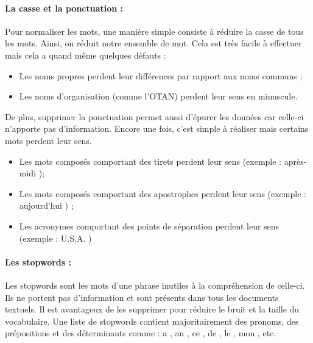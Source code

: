                 \paragraph{La casse et la ponctuation :}
                    Pour normaliser les mots, une manière simple consiste à réduire la casse de tous les mots. Ainsi, on réduit notre ensemble de mot. Cela est très facile à effectuer mais cela a quand même quelques défauts :
                    \begin{itemize}
                        \item Les noms propres perdent leur différences par rapport aux noms communs ;
                        \item Les noms d'organisation (comme l'OTAN) perdent leur sens en minuscule.
                    \end{itemize}
                    De plus, supprimer la ponctuation permet aussi d'épurer les données car celle-ci n'apporte pas d'information. Encore une fois, c'est simple à réaliser mais certains mots perdent leur sens.
                    \begin{itemize}
                        \item Les mots composés comportant des tirets perdent leur sens (exemple : \og après-midi \fg);
                        \item Les mots composés comportant des apostrophes perdent leur sens (exemple : \og aujourd'hui \fg) ;
                        \item Les acronymes comportant des points de séparation perdent leur sens (exemple : \og U.S.A. \fg)
                    \end{itemize}

                \paragraph{Les stopwords :}
                    Les stopwords sont les mots d'une phrase inutiles à la compréhension de celle-ci. Ils ne portent pas d'information et sont présents dans tous les documents textuels. Il est avantageux de les supprimer pour réduire le bruit et la taille du vocabulaire. Une liste de stopwords contient majoritairement des pronoms, des prépositions et des déterminants comme : \og a \fg, \og au \fg, \og ce \fg, \og de \fg, \og le \fg, \og mon \fg, etc.

